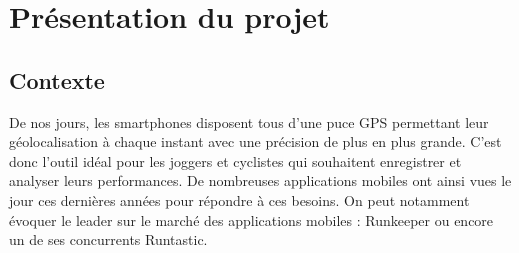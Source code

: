 \chapter{Présentation du projet}
\section{Contexte}
De nos jours, les smartphones disposent tous d'une puce GPS permettant leur géolocalisation à chaque instant avec une précision de plus en plus grande. C'est donc l'outil idéal pour les joggers et cyclistes qui souhaitent enregistrer et analyser leurs performances. De nombreuses applications mobiles ont ainsi vues le jour ces dernières années pour répondre à ces besoins. On peut notamment évoquer le leader sur le marché des applications mobiles : Runkeeper ou encore un de ses concurrents Runtastic.\bigskip \bigskip
